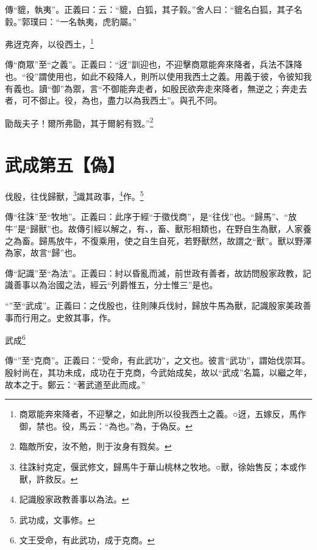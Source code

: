 {\noindent\zhuan{}\fzbyks 傳“貔，執夷”。正義曰：云：“貔，白狐，其子豰。”舍人曰：“貔名白狐，其子名豰。”郭璞曰：“一名執夷，虎豹屬。” \par}

弗迓克奔，以役西土，\footnote{商眾能奔來降者，不迎擊之，如此則所以役我西土之義。○迓，五嫁反，馬作御，禁也。役，馬云：“為也。”為，于偽反。}

{\noindent\zhuan{}\fzbyks 傳“商眾”至“之義”。正義曰：“迓”訓迎也，不迎擊商眾能奔來降者，兵法不誅降也。“役”謂使用也，如此不殺降人，則所以使用我西土之義。用義于彼，令彼知我有義也。讀“御”為禦，言“不御能奔走者，如殷民欲奔走來降者，無逆之；奔走去者，可不御止。役，為也，盡力以為我西土”。與孔不同。 \par}

勖哉夫子！爾所弗勖，其于爾躬有戮。”\footnote{臨敵所安，汝不勉，則于汝身有戮矣。}

\section{武成第五【偽】}


伐殷，往伐歸獸，\footnote{往誅紂克定，偃武修文，歸馬牛于華山桃林之牧地。○獸，徐始售反；本或作獸，許救反。}識其政事，\footnote{記識殷家政教善事以為法。}作。\footnote{武功成，文事修。}


{\noindent\zhuan{}\fzbyks 傳“往誅”至“牧地”。正義曰：此序于經“于徵伐商”，是“往伐”也。“歸馬”、“放牛”是“歸獸”也。故傳引經以解之，有、，畜、獸形相類也，在野自生為獸，人家養之為畜。歸馬放牛，不復乘用，使之自生自死，若野獸然，故謂之“獸”。獸以野澤為家，故言“歸”也。 \par}

{\noindent\zhuan{}\fzbyks 傳“記識”至“為法”。正義曰：紂以昏亂而滅，前世政有善者，故訪問殷家政教，記識善事以為治國之法，經云“列爵惟五，分士惟三”是也。 \par}

{\noindent\shu{}\fzkt “”至“武成”。正義曰：之伐殷也，往則陳兵伐紂，歸放牛馬為獸，記識殷家美政善事而行用之。史敘其事，作。 \par}

武成\footnote{文王受命，有此武功，成于克商。}

{\noindent\zhuan{}\fzbyks 傳“”至“克商”。正義曰：“受命，有此武功”，之文也。彼言“武功”，謂始伐崇耳。殷紂尚在，其功未成，成功在于克商，今武始成矣，故以“武成”名篇，以繼之年，故本之于。鄭云：“著武道至此而成。” \par}

